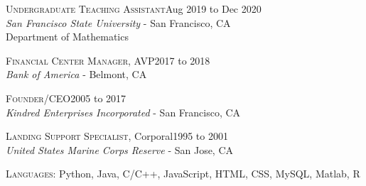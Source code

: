 \documentclass[hidelinks, 10pt]{article}
\begin{document}
{\vspace{2.5mm}

\begin{minipage}[ct]{0.9\linewidth}
\textsc{Undergraduate Teaching Assistant}\hfill Aug 2019 to Dec 2020\\
{\emph{San Francisco State University} - San Francisco, CA}\\
Department of Mathematics
\end{minipage}

\vspace{2.5mm}

\begin{minipage}[ct]{0.9\linewidth}
\textsc{Financial Center Manager}, AVP\hfill 2017 to 2018\\
{\emph{Bank of America} - Belmont, CA}
\end{minipage}

\vspace{2.5mm}

\begin{minipage}[ct]{0.9\linewidth}
\textsc{Founder/CEO}\hfill 2005 to 2017\\
{\emph{Kindred Enterprises Incorporated} - San Francisco, CA}
\end{minipage}

\vspace{2.5mm}

\begin{minipage}[ct]{0.9\linewidth}
\textsc{Landing Support Specialist}, Corporal\hfill 1995 to 2001\\
{\emph{United States Marine Corps Reserve} - San Jose, CA}
\end{minipage}

\vspace{7mm}


\hrulefill

\vspace{4mm}

\begin{minipage}[ct]{0.9\linewidth}
\textsc{Languages: } Python, Java, C/C++, JavaScript, HTML, CSS, MySQL, Matlab, R




\end{minipage}}
\end{document}

